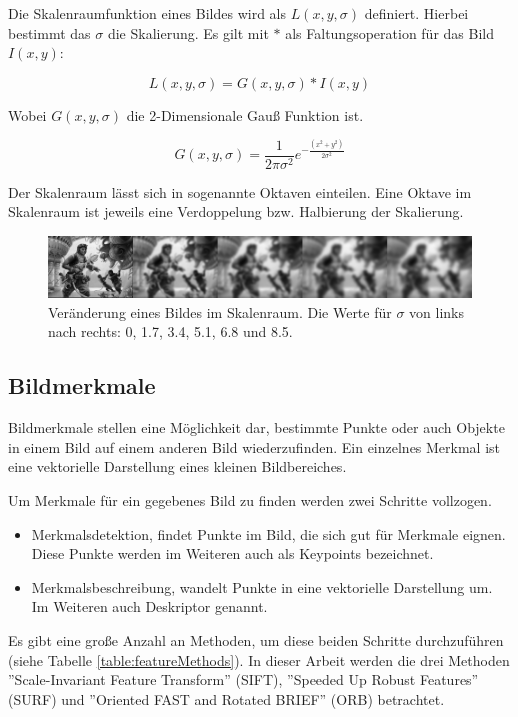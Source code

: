 Die Skalenraumfunktion eines Bildes wird als $L(x, y, \sigma)$ definiert. Hierbei bestimmt das $\sigma$ die Skalierung. Es gilt mit $*$ als Faltungsoperation für das Bild $I(x, y)$:

\[
L(x, y, \sigma) = G(x, y, \sigma) * I(x, y)
\] 


Wobei $G(x, y, \sigma)$ die 2-Dimensionale Gauß Funktion ist.

\[
G(x, y, \sigma) =  \frac{1}{2 \pi \sigma^{2}} e^{-\frac{(x^2+y^2)}{2\sigma^2}}
\]

Der Skalenraum lässt sich in sogenannte Oktaven einteilen. Eine Oktave im Skalenraum ist jeweils eine Verdoppelung bzw. Halbierung der Skalierung.

\begin{figure}[h]
    \centering
		\includegraphics[scale=0.5]{bilder/scaleSpace.png}
    	\caption{Veränderung eines Bildes im Skalenraum. Die Werte für $\sigma$ von links nach rechts: 0, 1.7, 3.4, 5.1, 6.8 und 8.5.}
    	\label{fig:scaleSpace}
\end{figure}


\subsection{Bildmerkmale}

Bildmerkmale stellen eine Möglichkeit dar, bestimmte Punkte oder auch Objekte in einem Bild auf einem anderen Bild wiederzufinden.
Ein einzelnes Merkmal ist eine vektorielle Darstellung eines kleinen Bildbereiches.

Um Merkmale für ein gegebenes Bild zu finden werden zwei Schritte vollzogen.

\begin{itemize}
\item Merkmalsdetektion, findet Punkte im Bild, die sich gut für Merkmale eignen. Diese Punkte werden im Weiteren auch als Keypoints bezeichnet.
\item Merkmalsbeschreibung, wandelt Punkte in eine vektorielle Darstellung um. Im Weiteren auch Deskriptor genannt.
\end{itemize}

Es gibt eine große Anzahl an Methoden, um diese beiden Schritte durchzuführen (siehe Tabelle \ref{table:featureMethods}).
In dieser Arbeit werden die drei Methoden ''Scale-Invariant Feature Transform'' (SIFT), ''Speeded Up Robust Features'' (SURF) und ''Oriented FAST and Rotated BRIEF'' (ORB) betrachtet. 

